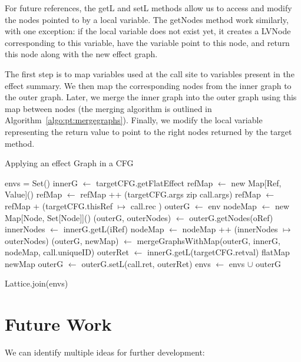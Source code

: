 \documentclass[a4paper]{article}
\begin{document}
For future references, the getL and setL methods allow us to access and modify
the nodes pointed to by a local variable. The getNodes method work similarly,
with one exception: if the local variable does not exist yet, it creates a
LVNode corresponding to this variable, have the variable point to this node,
and return this node along with the new effect graph.


The first step is to map variables used at the call site to variables present
in the effect summary. We then map the corresponding nodes from the inner graph
to the outer graph. Later, we merge the inner graph into the outer graph using this
map between nodes (the merging algorithm is outlined in
Algorithm~\ref{algo:pt:mergegraphs}). Finally, we modify the local variable
representing the return value to point to the right nodes returned by the
target method.


\begin{algorithm}
\caption{Applying an effect Graph in a CFG}\label{algo:pt:applyeffects}
\begin{algorithmic}[1]
    \State envs = Set()
        \State innerG $\gets$ targetCFG.getFlatEffect
        \State refMap $\gets$ new Map[Ref, Value]()
        \State refMap $\gets$ refMap ++ (targetCFG.args zip call.args)
        \State refMap $\gets$ refMap + (targetCFG.thisRef $\mapsto$ call.rec )
        \State
        \State outerG $\gets$ env
        \State nodeMap $\gets$ new Map[Node, Set[Node]]()
            \State (outerG, outerNodes) $\gets$ outerG.getNodes(oRef)
            \State innerNodes $\gets$ innerG.getL(iRef)
            \State nodeMap $\gets$ nodeMap ++ (innerNodes $\mapsto$ outerNodes)
        \EndFor
        \State
        \State (outerG, newMap) $\gets$ mergeGraphsWithMap(outerG, innerG, nodeMap, call.uniqueID)
        \State
        \State outerRet $\gets$ innerG.getL(targetCFG.retval) flatMap newMap
        \State outerG $\gets$ outerG.setL(call.ret, outerRet)
        \State
        \State envs $\gets$ envs $\cup$ outerG
    \EndFor

    \State \Return Lattice.join(envs)
\EndFunction
\end{algorithmic}
\end{algorithm}

\FloatBarrier

\section{Future Work}
We can identify multiple ideas for further development:
\end{document}

